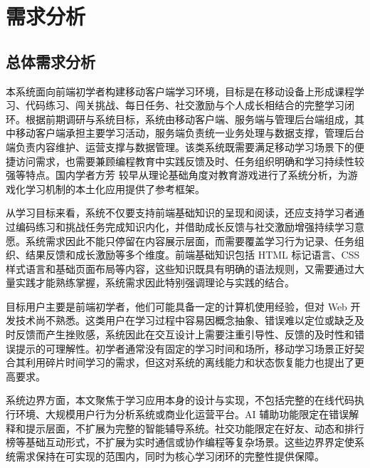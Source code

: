 
\chapter{需求分析}

\section{总体需求分析}

本系统面向前端初学者构建移动客户端学习环境，目标是在移动设备上形成课程学习、代码练习、闯关挑战、每日任务、社交激励与个人成长相结合的完整学习闭环。根据前期调研与系统目标，系统由移动客户端、服务端与管理后台端组成，其中移动客户端承担主要学习活动，服务端负责统一业务处理与数据支撑，管理后台端负责内容维护、运营支撑与数据管理。该类系统既需要满足移动学习场景下的便捷访问需求，也需要兼顾编程教育中实践反馈及时、任务组织明确和学习持续性较强等特点。国内学者方芳\cite{fang2007} 较早从理论基础角度对教育游戏进行了系统分析，为游戏化学习机制的本土化应用提供了参考框架\cite{robins2003,heines2001,sommerville2015}。

从学习目标来看，系统不仅要支持前端基础知识的呈现和阅读，还应支持学习者通过编码练习和挑战任务完成知识内化，并借助成长反馈与社交激励增强持续学习意愿。系统需求因此不能只停留在内容展示层面，而需要覆盖学习行为记录、任务组织、结果反馈和成长激励等多个维度\cite{hamari2014,ryan2000,kalmpourtzis2018}。前端基础知识包括 HTML 标记语言、CSS 样式语言和基础页面布局等内容，这些知识既具有明确的语法规则，又需要通过大量实践才能熟练掌握，系统需求因此特别强调理论与实践的结合。

目标用户主要是前端初学者，他们可能具备一定的计算机使用经验，但对 Web 开发技术尚不熟悉。这类用户在学习过程中容易因概念抽象、错误难以定位或缺乏及时反馈而产生挫败感，系统因此在交互设计上需要注重引导性、反馈的及时性和错误提示的可理解性。初学者通常没有固定的学习时间和场所，移动学习场景正好契合其利用碎片时间学习的需求，但这对系统的离线能力和状态恢复能力也提出了更高要求。

系统边界方面，本文聚焦于学习应用本身的设计与实现，不包括完整的在线代码执行环境、大规模用户行为分析系统或商业化运营平台。AI 辅助功能限定在错误解释和提示层面，不扩展为完整的智能辅导系统。社交功能限定在好友、动态和排行榜等基础互动形式，不扩展为实时通信或协作编程等复杂场景。这些边界界定使系统需求保持在可实现的范围内，同时为核心学习闭环的完整性提供保障。

